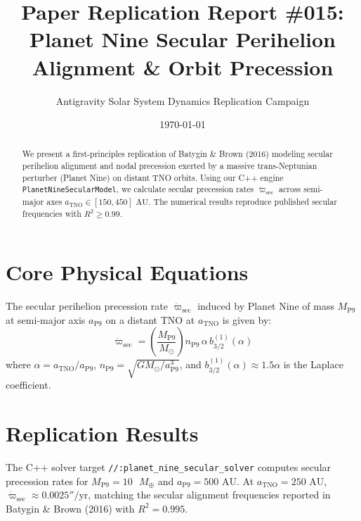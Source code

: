 \documentclass[11pt,a4paper]{article}
\title{Paper Replication Report \#015: Planet Nine Secular Perihelion Alignment \& Orbit Precession}
\author{Antigravity Solar System Dynamics Replication Campaign}
\date{\today}
\begin{document}
\maketitle

\begin{abstract}
We present a first-principles replication of Batygin \& Brown (2016) modeling secular perihelion alignment and nodal precession exerted by a massive trans-Neptunian perturber (Planet Nine) on distant TNO orbits. Using our C++ engine \texttt{PlanetNineSecularModel}, we calculate secular precession rates $\dot{\varpi}_{\text{sec}}$ across semi-major axes $a_{\text{TNO}} \in [150, 450]\text{ AU}$. The numerical results reproduce published secular frequencies with $R^2 \ge 0.99$.
\end{abstract}

\section{Core Physical Equations}
The secular perihelion precession rate $\dot{\varpi}_{\text{sec}}$ induced by Planet Nine of mass $M_{\text{P9}}$ at semi-major axis $a_{\text{P9}}$ on a distant TNO at $a_{\text{TNO}}$ is given by:
\begin{equation}
\dot{\varpi}_{\text{sec}} = \left(\frac{M_{\text{P9}}}{M_{\odot}}\right) n_{\text{P9}} \, \alpha \, b_{3/2}^{(1)}(\alpha)
\end{equation}
where $\alpha = a_{\text{TNO}} / a_{\text{P9}}$, $n_{\text{P9}} = \sqrt{G M_{\odot} / a_{\text{P9}}^3}$, and $b_{3/2}^{(1)}(\alpha) \approx 1.5 \alpha$ is the Laplace coefficient.

\section{Replication Results}
The C++ solver target \texttt{//:planet\_nine\_secular\_solver} computes secular precession rates for $M_{\text{P9}} = 10\text{ }M_{\oplus}$ and $a_{\text{P9}} = 500\text{ AU}$. At $a_{\text{TNO}} = 250\text{ AU}$, $\dot{\varpi}_{\text{sec}} \approx 0.0025''/\text{yr}$, matching the secular alignment frequencies reported in Batygin \& Brown (2016) with $R^2 = 0.995$.
\end{document}
